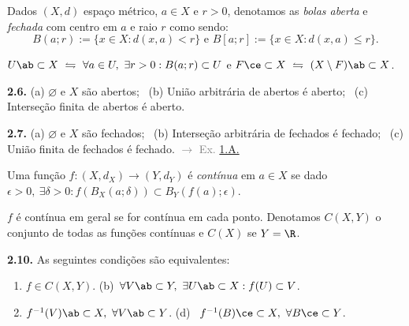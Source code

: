 \begin{definition}
    Dados \((X,d)\) espaço métrico, \(a \in X\) e \(r>0\), denotamos as  \emph{bolas aberta} e \emph{fechada} com centro em \(a\) e raio \(r\) como sendo:
    \[B(a;r) := \{x \in X : d(x,a)< r\} \text{ \ \ e \ \ }B[a;r]:= \{x\in X : d(x,a) \leq r\}.\]  
\end{definition}
\vspace{-0.5cm}
\begin{definition}
    \(U\ab \subset X \ \leftrightharpoons \ \forall a \in U, \ \exists r>0 : B(a;r)\subset U\) e \(F\ce\subset X \ \leftrightharpoons \ (X \setminus F)\ab \subset X\).
\end{definition}

\begin{proposition}
    \textbf{2.6.} (a) \(\varnothing\) e \(X\) são abertos; \ (b) União arbitrária de abertos é aberto; \ (c) Interseção finita de abertos é aberto. 
\end{proposition}

\newcommand{\comentario}[1]{\textcolor{gray}{\(\rightarrow\) #1}}
\hypertarget{coro27}{}
\begin{corollary}
    \textbf{2.7.} (a) \(\varnothing\) e \(X\) são fechados; \ (b) Interseção arbitrária de fechados é fechado; \ (c) União finita de fechados é fechado. \comentario{Ex. \hyperlink{demorgan}{1.A.}} 
\end{corollary}

\begin{definition}
    Uma função \(f: (X,d_X) \to (Y,d_Y)\) é \emph{contínua} em \(a \in X \) se dado \(\epsilon > 0, \ \exists \delta > 0 : f(B_X(a;\delta)) \subset B_Y(f(a); \epsilon)\). 
\end{definition}

\begin{note}
    \(f\) é contínua em geral se for contínua em cada ponto. Denotamos \(C(X,Y)\) o conjunto de todas as funções contínuas  e \(C(X)\) se \(Y = \R\).
\end{note}

\begin{proposition}
    \textbf{2.10.} As seguintes condições são equivalentes:
    \begin{enumerate}[label = (\alph*), left = 0.6cm]
        \item \(f \in C(X,Y)\). \hspace{3.8cm} (b)\ \(\forall V\ab \subset Y, \ \exists U\ab \subset X : f(U) \subset V\).  
        \item[(c)] \(f^{-1}(V)\ab \subset X, \ \forall V\ab \subset Y\).  \hspace{1.2cm} (d) \ \(f^{-1}(B)\ce \subset X, \ \forall B\ce \subset Y\).
    \end{enumerate}
\end{proposition}

